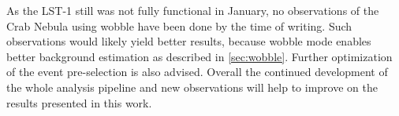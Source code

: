 As the LST-1 still was not fully functional in January, no observations of the Crab Nebula using wobble have been done by the time of writing.
Such observations would likely yield better results, because wobble mode enables better background estimation as described in \autoref{sec:wobble}.
Further optimization of the event pre-selection is also advised.
Overall the continued development of the whole analysis pipeline and new observations will help to improve on the results presented in this work.  